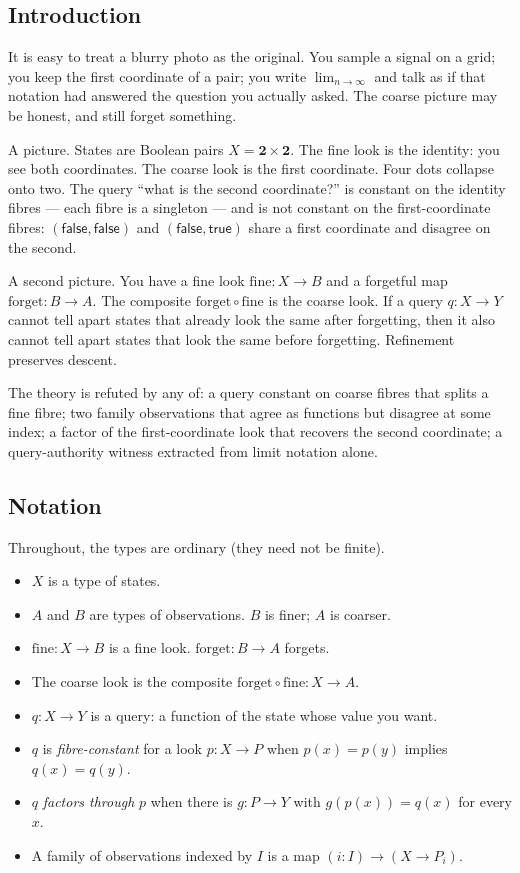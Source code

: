 \documentclass[
  11pt,
]{article}
\providecommand{\tightlist}{%
  \setlength{\itemsep}{0pt}\setlength{\parskip}{0pt}}
\begin{document}
\subsection{Introduction}\label{introduction}

It is easy to treat a blurry photo as the original. You sample a signal on a grid; you keep the first coordinate of a pair; you write \(\lim_{n\to\infty}\) and talk as if that notation had answered the question you actually asked. The coarse picture may be honest, and still forget something.

A picture. States are Boolean pairs \(X=\mathbf{2}\times\mathbf{2}\). The fine look is the identity: you see both coordinates. The coarse look is the first coordinate. Four dots collapse onto two. The query ``what is the second coordinate?'' is constant on the identity fibres --- each fibre is a singleton --- and is not constant on the first-coordinate fibres: \((\mathsf{false},\mathsf{false})\) and \((\mathsf{false},\mathsf{true})\) share a first coordinate and disagree on the second.

A second picture. You have a fine look \(\mathrm{fine}:X\to B\) and a forgetful map \(\mathrm{forget}:B\to A\). The composite \(\mathrm{forget}\circ\mathrm{fine}\) is the coarse look. If a query \(q:X\to Y\) cannot tell apart states that already look the same after forgetting, then it also cannot tell apart states that look the same before forgetting. Refinement preserves descent.

The theory is refuted by any of: a query constant on coarse fibres that splits a fine fibre; two family observations that agree as functions but disagree at some index; a factor of the first-coordinate look that recovers the second coordinate; a query-authority witness extracted from limit notation alone.

\subsection{Notation}\label{notation}

Throughout, the types are ordinary (they need not be finite).

\begin{itemize}
\tightlist
\item
  \(X\) is a type of states.
\item
  \(A\) and \(B\) are types of observations. \(B\) is finer; \(A\) is coarser.
\item
  \(\mathrm{fine}:X\to B\) is a fine look. \(\mathrm{forget}:B\to A\) forgets.
\item
  The coarse look is the composite \(\mathrm{forget}\circ\mathrm{fine}:X\to A\).
\item
  \(q:X\to Y\) is a query: a function of the state whose value you want.
\item
  \(q\) is \emph{fibre-constant} for a look \(p:X\to P\) when \(p(x)=p(y)\) implies \(q(x)=q(y)\).
\item
  \(q\) \emph{factors through} \(p\) when there is \(g:P\to Y\) with \(g(p(x))=q(x)\) for every \(x\).
\item
  A family of observations indexed by \(I\) is a map \((i:I)\to (X\to P_i)\).
\end{itemize}
\end{document}
